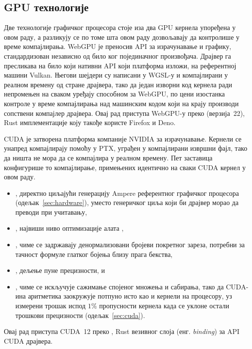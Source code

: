 \documentclass[serbian]{ftndiplomski}
\begin{document}
\subsection{GPU технологије}
\label{sec:gpu-tech}

Две технологије графичког процесора стоје иза два GPU кернела упоређена у овом раду, а
разликују се по томе шта овом раду дозвољавају да контролише у време компајлирања.
WebGPU је преносив API за израчунавање и графику, стандардизован независно од било
ког појединачног произвођача. Драјвер га пресликава на било који нативни API који
платформа изложи, на референтној машини Vulkan. Његови шејдери су написани у WGSL-у и
компајлирани у реалном времену од стране драјвера, тако да један изворни код кернела
ради непромењен на сваком уређају способном за WebGPU, по цени изостанка контроле у
време компајлирања над машинским кодом који на крају производи сопствени компајлер
драјвера. Овај рад приступа WebGPU-у преко  (верзија~22), Rust
имплементације коју такође користе Firefox и Deno.

CUDA је затворена платформа компаније NVIDIA за израчунавање. Кернели се унапред
компајлирају помоћу  у PTX, уграђен у компајлирани извршни фајл, тако да
ништа не мора да се компајлира у реалном времену. Пет заставица конфигурише то
компајлирање, примењених идентично на
сваки CUDA кернел у овом раду.
\begin{itemize}
  \item {}, директно циљајући генерацију Ampere
  референтног графичког процесора (одељак~\ref{sec:hardware}), уместо генеричког
  циља који би драјвер морао да преводи при учитавању,
  \item {}, највиши ниво оптимизације алата ,
  \item {}, чиме се задржавају денормализовани бројеви покретног
  зареза, потребни за тачност формуле глатког бојења близу прага бекства,
  \item {}, дељење пуне прецизности, и
  \item {}, чиме се искључује сажимање спојеног множења и сабирања,
  тако да CUDA-ина аритметика заокружује потпуно исто као и кернели на процесору, уз
  измерени трошак испод $1\%$ пропусности кернела када се уклоне остали трошкови
  прецизности (одељак~\ref{sec:cuda}).
\end{itemize}
Овај рад приступа CUDA~12 преко , Rust везивног слоја (енг. \emph{binding}) за
API CUDA драјвера.
\end{document}
